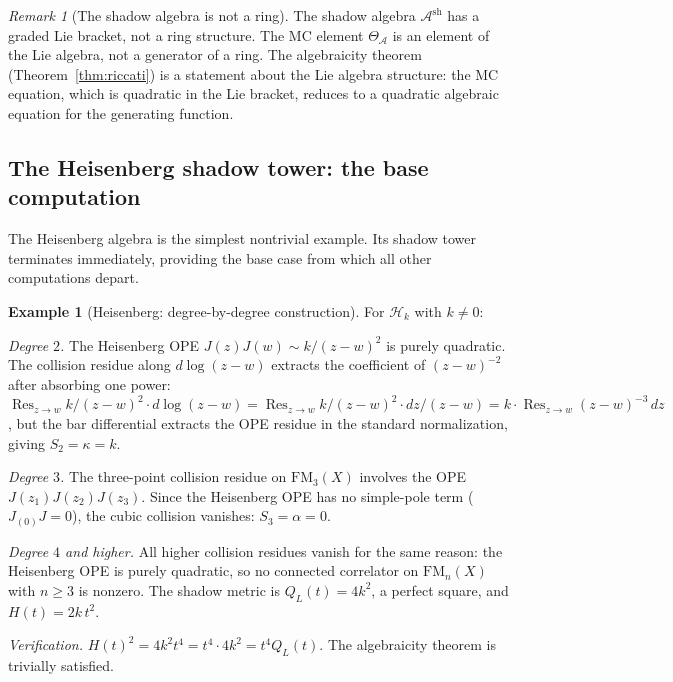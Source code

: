 \documentclass[11pt,reqno]{amsart}
\theoremstyle{definition}
\newtheorem{example}[theorem]{Example}
\theoremstyle{remark}
\newtheorem{remark}[theorem]{Remark}
\newcommand{\cA}{\mathcal{A}}
\newcommand{\cH}{\mathcal{H}}
\newcommand{\FM}{\mathrm{FM}}
\DeclareMathOperator{\Res}{Res}
\numberwithin{equation}{section}
\begin{document}
\begin{remark}[The shadow algebra is not a
ring]\label{rem:not-ring}
The shadow algebra $\cA^{\mathrm{sh}}$ has a graded Lie
bracket, not a ring structure. The MC element
$\Theta_\cA$ is an element of the Lie algebra, not a
generator of a ring. The algebraicity theorem
(Theorem~\ref{thm:riccati}) is a statement about the Lie
algebra structure: the MC equation, which is quadratic in
the Lie bracket, reduces to a quadratic algebraic equation
for the generating function.
\end{remark}


\subsection{The Heisenberg shadow tower: the base
computation}\label{subsec:heisenberg-base}

The Heisenberg algebra is the simplest nontrivial example.
Its shadow tower terminates immediately, providing the base
case from which all other computations depart.

\begin{example}[Heisenberg: degree-by-degree
construction]\label{ex:heisenberg-degrees}
For $\cH_k$ with $k \ne 0$:

\emph{Degree $2$.}\enspace
The Heisenberg OPE $J(z)J(w) \sim k/(z-w)^2$ is purely
quadratic. The collision residue along $d\!\log(z-w)$ extracts
the coefficient of $(z-w)^{-2}$ after absorbing one power:
$\Res_{z \to w} k/(z-w)^2 \cdot d\!\log(z-w)
= \Res_{z \to w} k/(z-w)^2 \cdot dz/(z-w)
= k \cdot \Res_{z \to w} (z-w)^{-3}\, dz$,
but the bar differential extracts the OPE residue in the
standard normalization, giving $S_2 = \kappa = k$.

\emph{Degree $3$.}\enspace
The three-point collision residue on $\FM_3(X)$ involves
the OPE $J(z_1)J(z_2)J(z_3)$. Since the Heisenberg OPE
has no simple-pole term ($J_{(0)}J = 0$), the cubic
collision vanishes: $S_3 = \alpha = 0$.

\emph{Degree $4$ and higher.}\enspace
All higher collision residues vanish for the same reason:
the Heisenberg OPE is purely quadratic, so no connected
correlator on $\FM_n(X)$ with $n \ge 3$ is nonzero.
The shadow metric is $Q_L(t) = 4k^2$, a perfect square,
and $H(t) = 2k\, t^2$.

\emph{Verification.}\enspace
$H(t)^2 = 4k^2 t^4 = t^4 \cdot 4k^2 = t^4 Q_L(t)$.
The algebraicity theorem is trivially satisfied.
\end{example}
\end{document}
